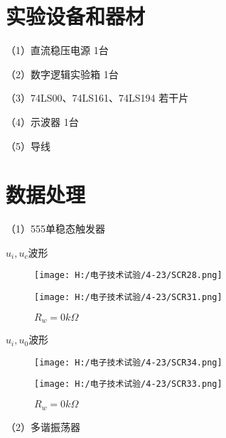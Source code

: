 \documentclass{article}
\begin{document}
\section{ 实验设备和器材}
（1）直流稳压电源              \qquad \quad \qquad \qquad \qquad \qquad           1台\par
（2）数字逻辑实验箱            \qquad  \qquad \qquad \qquad\qquad                1台\par
（3）74LS00、74LS161、74LS194              \quad                                    若干片\par
（4）示波器                   \qquad  \qquad \qquad \qquad\qquad  \qquad  \qquad    1台\par
（5）导线   
\section{ 数据处理}
（1）555单稳态触发器\par
$u_i,u_c$波形
\begin{figure}[h]
    \begin{minipage}[t]{0.5\linewidth} %
      \centering   
      \texttt{[image: H:/电子技术试验/4-23/SCR28.png]}   
      \caption{$R_w=116.2k\Omega$}   
      \label{fig:side:a}   
    \end{minipage}%
    \begin{minipage}[t]{0.5\linewidth}   
      \centering   
      \texttt{[image: H:/电子技术试验/4-23/SCR31.png]}   
      \caption{$R_w=0k\Omega$}   
      \label{fig:side:b}   
    \end{minipage}   
  \end{figure}
  $u_i,u_0$波形
  \begin{figure}[h]
    \begin{minipage}[t]{0.5\linewidth} %
      \centering   
      \texttt{[image: H:/电子技术试验/4-23/SCR34.png]}   
      \caption{$R_w=116.2k\Omega$}   
      \label{fig:side:a}   
    \end{minipage}%
    \begin{minipage}[t]{0.5\linewidth}   
      \centering   
      \texttt{[image: H:/电子技术试验/4-23/SCR33.png]}   
      \caption{$R_w=0k\Omega$}   
      \label{fig:side:b}   
    \end{minipage}   
  \end{figure}
\par
  （2）多谐振荡器\par
\end{document}
